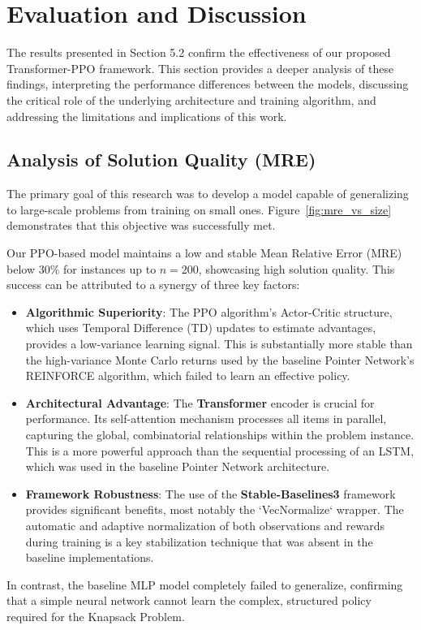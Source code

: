 
\section{Evaluation and Discussion}
\label{sec:discussion}

The results presented in Section 5.2 confirm the effectiveness of our proposed Transformer-PPO framework. This section provides a deeper analysis of these findings, interpreting the performance differences between the models, discussing the critical role of the underlying architecture and training algorithm, and addressing the limitations and implications of this work.

\subsection{Analysis of Solution Quality (MRE)}
The primary goal of this research was to develop a model capable of generalizing to large-scale problems from training on small ones. Figure~\ref{fig:mre_vs_size} demonstrates that this objective was successfully met.

Our PPO-based model maintains a low and stable Mean Relative Error (MRE) below 30\% for instances up to $n=200$, showcasing high solution quality. This success can be attributed to a synergy of three key factors:
\begin{itemize}
    \item \textbf{Algorithmic Superiority}: The PPO algorithm's Actor-Critic structure, which uses Temporal Difference (TD) updates to estimate advantages, provides a low-variance learning signal. This is substantially more stable than the high-variance Monte Carlo returns used by the baseline Pointer Network's REINFORCE algorithm, which failed to learn an effective policy.
    \item \textbf{Architectural Advantage}: The \textbf{Transformer} encoder is crucial for performance. Its self-attention mechanism processes all items in parallel, capturing the global, combinatorial relationships within the problem instance. This is a more powerful approach than the sequential processing of an LSTM, which was used in the baseline Pointer Network architecture.
    \item \textbf{Framework Robustness}: The use of the \textbf{Stable-Baselines3} framework provides significant benefits, most notably the `VecNormalize` wrapper. The automatic and adaptive normalization of both observations and rewards during training is a key stabilization technique that was absent in the baseline implementations.
\end{itemize}
In contrast, the baseline MLP model completely failed to generalize, confirming that a simple neural network cannot learn the complex, structured policy required for the Knapsack Problem.


